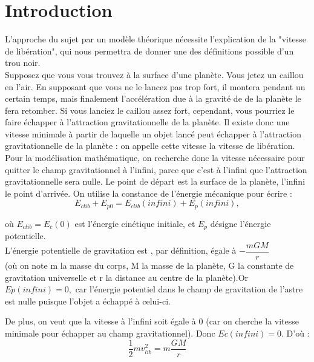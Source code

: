 \documentclass[12pt,  a4paper, openright]{report} %
\begin{document}
	\chapter*{Introduction}
	L'approche du sujet par un modèle théorique nécessite l'explication de la "vitesse de libération", qui nous permettra de donner une des définitions possible d'un trou noir.\\
	Supposez que vous vous trouvez à la surface d'une planète. Vous jetez un caillou en l'air. En supposant que vous ne le lancez pas trop fort, il montera pendant un certain temps, mais finalement l'accélération due à la gravité de de la planète le fera retomber. 
	Si vous lanciez le caillou assez fort, cependant, vous pourriez le faire échapper à l'attraction gravitationnelle de la planète. Il existe donc une vitesse minimale à partir de laquelle un objet lancé peut échapper à l'attraction gravitationnelle de la planète : on appelle cette vitesse la vitesse de libération.\\ 
	Pour la modélisation mathématique, on recherche donc la vitesse nécessaire pour quitter le champ gravitationnel à l'infini, parce que c'est à l'infini que l'attraction gravitationnelle sera nulle. Le point de départ est la surface de la planète, l'infini le point d'arrivée.
	On utilise la constance de l'énergie mécanique pour écrire :\\
	\begin{equation}
		E_{clib}+E_{p0}=E_{clib}(infini)+E_{p}(infini),
	\end{equation}

	où  $E_{clib} = E_{c} (0)$  est l'énergie cinétique initiale, et $ E_{p}$ désigne l'énergie potentielle.\\
	L'énergie potentielle de gravitation est , par définition, égale à $-\dfrac{mGM}{r}$ \\
	(où on note m la masse du corps, M la masse de la planète, G la constante de gravitation universelle et r la distance au centre de la planète).Or $ Ep (infini)  = 0, $ car l'énergie potentiel dans le champ de gravitation de l'astre est nulle puisque l'objet a échappé à celui-ci.
	
	
	
	
	De plus, on veut que la vitesse à l'infini soit égale à 0 (car on cherche la vitesse minimale pour échapper au champ gravitationnel). Donc $Ec (infini)  = 0$. 
	D'où :
	\begin{equation}
	\dfrac{1}{2} m v_{lib}^{2} = m \dfrac{GM}{r}
	\end{equation}
	
\end{document}
